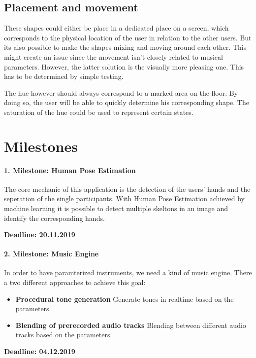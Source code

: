 \documentclass[titlepage, a4paper, 11pt]{scrartcl}
\begin{document}
\subsection{Placement and movement}

These shapes could either be place in a dedicated place on a screen, which corresponds to the physical location of the user in relation to the other users.
But its also possible to make the shapes mixing and moving around each other. This might create an issue since the movement isn't closely related to musical parameters.
However, the latter solution is the visually more pleasing one. This has to be determined by simple testing.

The hue however should always correspond to a marked area on the floor. By doing so, the user will be able to quickly determine his corresponding shape.
The saturation of the hue could be used to represent certain states.

\section{Milestones}

\paragraph{1. Milestone: Human Pose Estimation}

The core mechanic of this application is the detection of the users' hands and the seperation of the single participants.
With Human Pose Estimation achieved by machine learning it is possible to detect multiple skeltons in an image and identify the corresponding hands.
\begin{flushright}
    \textbf{Deadline: 20.11.2019}
\end{flushright}

\paragraph{2. Milestone: Music Engine}

In order to have paramterized instruments, we need a kind of music engine.
There a two different approaches to achieve this goal:
\begin{itemize}
    \item \textbf{Procedural tone generation} Generate tones in realtime based on the parameters.
    \item \textbf{Blending of prerecorded audio tracks} Blending between different audio tracks based on the parameters.
\end{itemize}
\begin{flushright}
    \textbf{Deadline: 04.12.2019}
\end{flushright}
\end{document}
